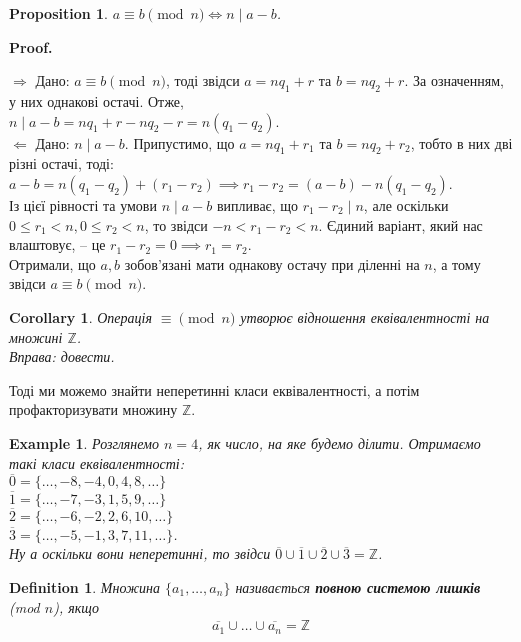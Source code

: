 \documentclass[a4paper, 14pt]{extarticle}
\makeatletter
\theoremstyle{theoremdd}
\theoremstyle{theoremdd}
\newtheorem{definition}[theorem]{Definition}
\theoremstyle{theoremdd}
\theoremstyle{theoremdd}
\newtheorem{example}[theorem]{Example}
\theoremstyle{theoremdd}
\newtheorem{proposition}[theorem]{Proposition}
\theoremstyle{theoremdd}
\theoremstyle{theoremdd}
\theoremstyle{theoremdd}
\newtheorem{corollary}[theorem]{Corollary}
\def\qed{$\blacksquare$}
\def\rightproof{$\boxed{\Rightarrow}$ }
\def\leftproof{$\boxed{\Leftarrow}$ }
\renewenvironment{proof}[1][Proof.\\]{\par
\pushQED{\hfill \qed}%
\normalfont \topsep6\p@\@plus6\p@\relax
\trivlist
\item\relax
{\bfseries
#1\@addpunct{.}}\hspace\labelsep\ignorespaces
}{%
\popQED\endtrivlist\@endpefalse
}
\makeatother
\begin{document}
\begin{proposition}
$a \equiv b \pmod n \iff n \mid a-b$.
\end{proposition}

\begin{proof}
\rightproof Дано: $a \equiv b \pmod n$, тоді звідси $a = nq_1 + r$ та $b = nq_2 + r$. За означенням, у них однакові остачі. Отже,\\
$n \mid a - b = nq_1 + r - nq_2 - r = n(q_1-q_2)$.
\bigskip \\
\leftproof Дано: $n \mid a-b$. Припустимо, що $a = nq_1+r_1$ та $b = nq_2 + r_2$, тобто в них дві різні остачі, тоді:\\
$a - b = n(q_1-q_2) + (r_1-r_2) \implies r_1 - r_2 = (a-b) - n(q_1-q_2)$.\\
Із цієї рівності та умови $n \mid a-b$ випливає, що $r_1 - r_2 \mid n$, але оскільки $0 \leq r_1 < n, 0 \leq r_2 < n$, то звідси $-n < r_1 - r_2 < n$. Єдиний варіант, який нас влаштовує, -- це $r_1 - r_2 = 0 \implies r_1 = r_2$.\\
Отримали, що $a,b$ зобов'язані мати однакову остачу при діленні на $n$, а тому звідси $a \equiv b \pmod n$.
\end{proof}

\begin{corollary}
Операція $\equiv \!\!\pmod n$ утворює відношення еквівалентності на множині $\mathbb{Z}$.\\
\textit{Вправа: довести.}
\end{corollary}

Тоді ми можемо знайти неперетинні класи еквівалентності, а потім профакторизувати множину $\mathbb{Z}$.

\begin{example}
Розглянемо $n = 4$, як число, на яке будемо ділити. Отримаємо такі класи еквівалентності:\\
$\overline{0} = \{\dots,-8,-4,0,4,8,\dots\}$\\
$\overline{1} = \{\dots,-7,-3,1,5,9,\dots\}$\\
$\overline{2} = \{\dots,-6,-2,2,6,10,\dots\}$\\
$\overline{3} = \{\dots,-5,-1,3,7,11,\dots\}$.\\
Ну а оскільки вони неперетинні, то звідси $\overline{0} \cup \overline{1} \cup \overline{2} \cup \overline{3} = \mathbb{Z}$.
\end{example}

\begin{definition}
Множина $\{a_1,\dots,a_n\}$ називається \textbf{повною системою лишків} (mod $n$), якщо
\begin{align*}
\overline{a_1} \cup \dots \cup \overline{a_n} = \mathbb{Z}
\end{align*}
\end{definition}
\end{document}

